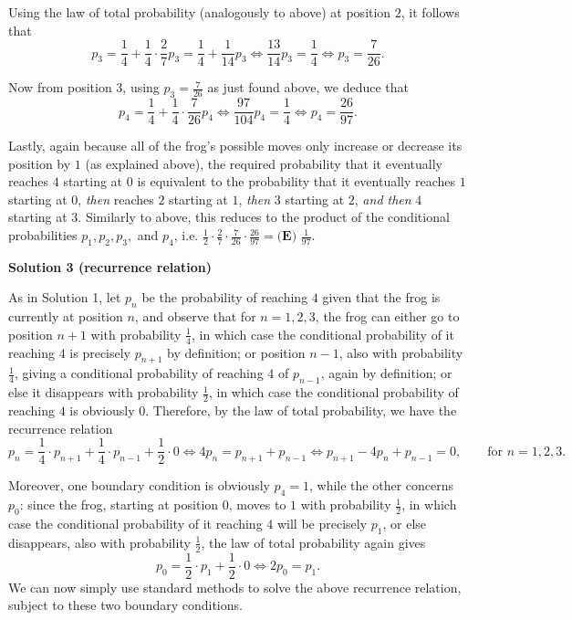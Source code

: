 \begin{enumerate}
 Using the law of total probability (analogously to above) at position $2$, it follows that
 \[p_3 = \frac{1}{4} + \frac{1}{4} \cdot \frac{2}{7} p_3 = \frac{1}{4} + \frac{1}{14} p_3 \iff \frac{13}{14} p_3 = \frac{1}{4} \iff p_3 = \frac{7}{26}.\]

 Now from position 3, using $p_3 = \frac{7}{26}$ as just found above, we deduce that
 \[p_4 = \frac{1}{4} + \frac{1}{4} \cdot \frac{7}{26} p_4 \iff \frac{97}{104} p_4 = \frac{1}{4} \iff p_4 = \frac{26}{97}.\]

 Lastly, again because all of the frog's possible moves only increase or decrease its position by $1$ (as explained above), the required probability that it eventually reaches $4$ starting at $0$ is equivalent to the probability that it eventually reaches $1$ starting at $0$, \textit{then} reaches $2$ starting at $1$, \textit{then} $3$ starting at $2$, \textit{and then} $4$ starting at $3$. Similarly to above, this reduces to the product of the conditional probabilities $p_1, p_2, p_3,$ and $p_4$, i.e. $\frac{1}{2} \cdot \frac{2}{7} \cdot \frac{7}{26} \cdot \frac{26}{97} = \boxed{ \textbf{(E) } \frac{1}{97}}.$




\textbf{Solution 3 (recurrence relation)}

As in Solution 1, let $p_n$ be the probability of reaching $4$ given that the frog is currently at position $n$, and observe that for $n = 1,2,3$, the frog can either go to position $n+1$ with probability $\frac{1}{4}$, in which case the conditional probability of it reaching $4$ is precisely $p_{n+1}$ by definition; or position $n-1$, also with probability $\frac{1}{4}$, giving a conditional probability of reaching $4$ of $p_{n-1}$, again by definition; or else it disappears with probability $\frac{1}{2}$, in which case the conditional probability of reaching $4$ is obviously $0$. Therefore, by the law of total probability, we have the recurrence relation 
 \[p_n = \frac{1}{4} \cdot p_{n+1} + \frac{1}{4} \cdot p_{n-1} + \frac{1}{2} \cdot 0 \iff 4p_n = p_{n+1}+p_{n-1} \iff p_{n+1}-4p_n+p_{n-1} = 0, \qquad \text{for } n = 1,2,3.\]

 Moreover, one boundary condition is obviously $p_4 = 1$, while the other concerns $p_0$: since the frog, starting at position $0$, moves to $1$ with probability $\frac{1}{2}$, in which case the conditional probability of it reaching $4$ will be precisely $p_1$, or else disappears, also with probability $\frac{1}{2}$, the law of total probability again gives 
 \[p_0 = \frac{1}{2} \cdot p_1 + \frac{1}{2} \cdot 0 \iff 2p_0 = p_1.\] We can now simply use standard methods to solve the above recurrence relation, subject to these two boundary conditions.


\end{enumerate}
